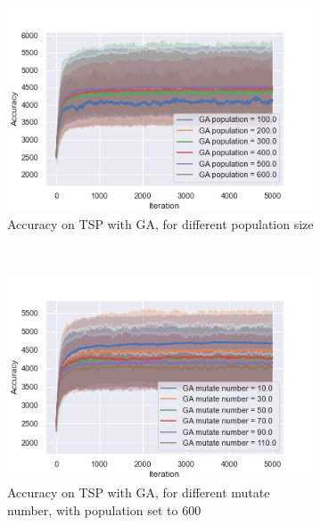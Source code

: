 \documentclass[10pt]{article}
\begin{document}
				\begin{figure}[h]
					\centering
					\begin{subfigure}[t]{0.32\columnwidth}
						\centering
						\includegraphics[width=\linewidth]{../graphics/tsp_GA_Iteration_Error_GA_population.png}
						\caption{Accuracy on TSP with GA, for different population size}
						\label{tsp:ga_pop}
					\end{subfigure}
					~
					\begin{subfigure}[t]{0.32\columnwidth}
						\centering
						\includegraphics[width=\linewidth]{../graphics/tsp_GA_Iteration_Error_GA_mutate_number.png}
						\caption{Accuracy on TSP with GA, for different mutate number, with population set to 600}
						\label{tsp:ga_mutate}
					\end{subfigure}
					~
					\begin{subfigure}[t]{0.32\columnwidth}
						\centering

\end{subfigure}
\end{figure}
\end{document}
